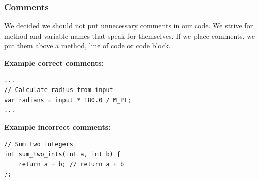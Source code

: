 \subsubsection{Comments}
We decided we should not put unnecessary comments in our code. We strive for method and variable names that speak for themselves. If we place comments, we put them above a method, line of code or code block.

\textbf{Example correct comments:}
\begin{lstlisting}
...
// Calculate radius from input
var radians = input * 180.0 / M_PI;
...
\end{lstlisting}

\textbf{Example incorrect comments:}
\begin{lstlisting}
// Sum two integers
int sum_two_ints(int a, int b) {
	return a + b; // return a + b
};
\end{lstlisting}
